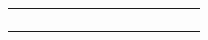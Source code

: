\documentclass[a4paper,oneside]{report}
\begin{document}

\begin{figure}[htbp]
\begin{tabular}[c]{cc}
\begin{subfigure}[c]{0.45\textwidth}
\begin{adjustbox}{max width=\textwidth}

\end{adjustbox}
\end{subfigure}&

\begin{subfigure}[c]{0.45\textwidth}
\begin{adjustbox}{max width=\textwidth}

\end{adjustbox}
\end{subfigure}\\

\end{tabular}
\end{figure}  
\end{document}

